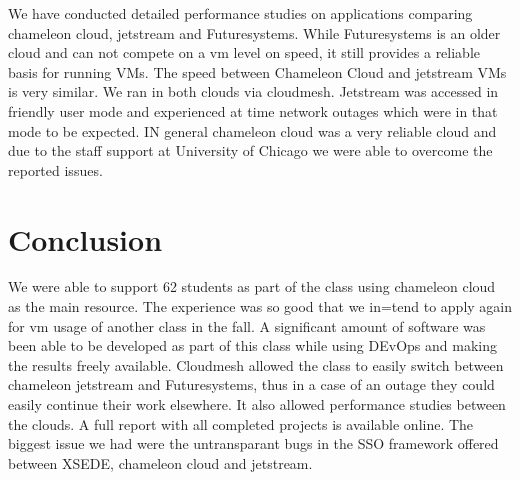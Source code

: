 \documentclass[sigconf]{acmart}
\begin{document}
We have conducted detailed performance studies on applications
comparing chameleon cloud, jetstream and Futuresystems. While
Futuresystems is an older cloud and can not compete on a vm level on
speed, it still provides a reliable basis for running VMs. The speed
between Chameleon Cloud and jetstream VMs is very similar. We ran in
both clouds via cloudmesh. Jetstream was accessed in friendly user
mode and experienced at time network outages which were in that mode
to be expected. IN general chameleon cloud was a very reliable cloud
and due to the staff support at University of Chicago we were able to
overcome the reported issues.

\section{Conclusion}

We were able to support 62 students as part of the class using
chameleon cloud as the main resource. The experience was so good that
we in=tend to apply again for vm usage of another class in the fall. A
significant amount of software was been able to be developed as part
of this class while using DEvOps and making the results freely
available. Cloudmesh allowed the class to easily switch between
chameleon jetstream and Futuresystems, thus in a case of an outage
they could easily continue their work elsewhere. It also allowed
performance studies between the clouds. A full report with all
completed projects is available online. The biggest issue we had were
the untransparant bugs in the SSO framework offered between XSEDE,
chameleon cloud and jetstream.



 
\end{document}
